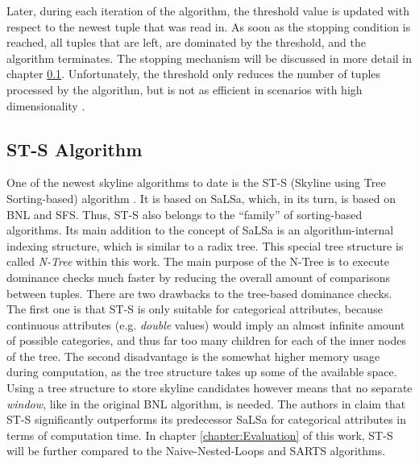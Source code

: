 Later, during each iteration of the algorithm, the threshold value is updated with respect to the newest tuple that was read in. As soon as the stopping condition is reached, all tuples that are left, are dominated by the threshold, and the algorithm terminates. The stopping mechanism will be discussed in more detail in chapter \ref{subsection:sts}. 
Unfortunately, the threshold only reduces the number of tuples processed by the algorithm, but is not as efficient in scenarios with high dimensionality \cite{survey}. 

\subsection{ST-S Algorithm} \label{subsection:sts}
One of the newest skyline algorithms to date is the ST-S (Skyline using Tree Sorting-based) algorithm \cite{rahman}. It is based on SaLSa, which, in its turn, is based on BNL and SFS. Thus, ST-S also belongs to the ``family'' of sorting-based algorithms. Its main addition to the concept of SaLSa is an algorithm-internal indexing structure, which is similar to a radix tree. This special tree structure is called \textit{N-Tree} within this work. The main purpose of the N-Tree is to execute dominance checks much faster by reducing the overall amount of comparisons between tuples. There are two drawbacks to the tree-based dominance checks. The first one is that ST-S is only suitable for categorical attributes, because continuous attributes (e.g. \textit{double} values) would imply an almost infinite amount of possible categories, and thus far too many children for each of the inner nodes of the tree. The second disadvantage is the somewhat higher memory usage during computation, as the tree structure takes up some of the available space. Using a tree structure to store skyline candidates however means that no separate \textit{window}, like in the original BNL algorithm, is needed. The authors in \cite{rahman} claim that ST-S significantly outperforms its predecessor SaLSa for categorical attributes in terms of computation time. In chapter \ref{chapter:Evaluation} of this work, ST-S will be further compared to the Naive-Nested-Loops and SARTS algorithms. 

